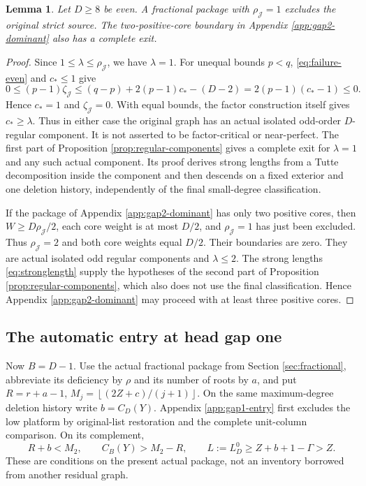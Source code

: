 \documentclass[11pt,a4paper]{article}
\newcommand{\floor}[1]{\left\lfloor#1\right\rfloor}
\newtheorem{lemma}[theorem]{Lemma}
\theoremstyle{definition}
\begin{document}
\begin{lemma}\label{lem:rho1}
Let $D\ge8$ be even. A fractional package with $\rho_{\mathcal J}=1$ excludes the original strict source. The two-positive-core boundary in Appendix \ref{app:gap2-dominant} also has a complete exit.
\end{lemma}
\begin{proof}
Since $1\le\lambda\le\rho_{\mathcal J}$, we have $\lambda=1$. For unequal bounds $p<q$, \eqref{eq:failure-even} and $c_*\le1$ give
\[
0\le(p-1)\zeta_{\mathcal J}
\le(q-p)+2(p-1)c_*-(D-2)=2(p-1)(c_*-1)\le0.
\]
Hence $c_*=1$ and $\zeta_{\mathcal J}=0$. With equal bounds, the factor construction itself gives $c_*\ge\lambda$. Thus in either case the original graph has an actual isolated odd-order $D$-regular component. It is not asserted to be factor-critical or near-perfect.
The first part of Proposition \ref{prop:regular-components} gives a complete exit for $\lambda=1$ and any such actual component. Its proof derives strong lengths from a Tutte decomposition inside the component and then descends on a fixed exterior and one deletion history, independently of the final small-degree classification.

If the package of Appendix \ref{app:gap2-dominant} has only two positive cores, then $W\ge D\rho_{\mathcal J}/2$, each core weight is at most $D/2$, and $\rho_{\mathcal J}=1$ has just been excluded. Thus $\rho_{\mathcal J}=2$ and both core weights equal $D/2$. Their boundaries are zero. They are actual isolated odd regular components and $\lambda\le2$. The strong lengths \eqref{eq:stronglength} supply the hypotheses of the second part of Proposition \ref{prop:regular-components}, which also does not use the final classification. Hence Appendix \ref{app:gap2-dominant} may proceed with at least three positive cores.
\end{proof}

\subsection{The automatic entry at head gap one}
Now $B=D-1$. Use the actual fractional package from Section \ref{sec:fractional}, abbreviate its deficiency by $\rho$ and its number of roots by $a$, and put $R=r+a-1$, $M_j=\floor{(2Z+c)/(j+1)}$. On the same maximum-degree deletion history write $b=C_D(Y)$. Appendix \ref{app:gap1-entry} first excludes the low platform by original-list restoration and the complete unit-column comparison. On its complement,
\begin{equation}\label{eq:gamma1gate}
R+b<M_2,\qquad C_B(Y)>M_2-R,\qquad
L:=L_D^0\ge Z+b+1-\Gamma>Z.
\end{equation}
These are conditions on the present actual package, not an inventory borrowed from another residual graph.
\end{document}
